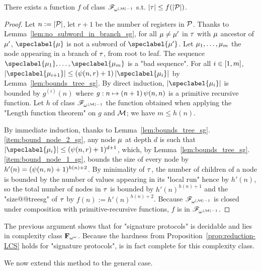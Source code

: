 \begin{proposition}
\label{prop:bounded_witness_sg}
There exists a function $f$ of class $\mathscr{F}_{\omega^{|\mathcal{M}|-1}}$ s.t. $|\tau| \leq f(|\mathcal{P}|)$. 
\end{proposition}
\begin{proof}
Let $n := |\mathcal{P}|$, let $r+1$ be the number of registers in $\mathcal{P}$. Thanks to Lemma~\ref{lem:no_subword_in_branch_sg}, for all $\mu \ne \mu'$ in 
$\tau$ with $\mu$ ancestor of $\mu'$, $\speclabel{\node}$ is not a subword of $\speclabel{\node'}$.  Let $\mu_1, \dots, \mu_m$ the node appearing in a branch of $\tau$, from root to leaf. The sequence $\speclabel{\node_1}, \dots, \speclabel{\node_m}$ is a "bad sequence".
For all $i \in [1,m]$, $\size{\speclabel{\node_{i+1}}}  \leq (\towerfun(n,r)+1) \, \size{\speclabel{\node_i}}$ by Lemma~\ref{lem:bounds_tree_sg}. By direct induction, $\size{\speclabel{\node_i}}$ is bounded by $g^{(i)}(n)$ where $g: n \mapsto (n+1)  \, \psi(n,n)$ is a primitive recursive function. Let $h$ of class $\mathscr{F}_{\omega^{|\mathcal{M}|-1}}$ the function obtained when applying the "Length function theorem" on $g$ and $\mathcal{M}$; we have $m \leq h(n)$. 

By immediate induction, thanks to Lemma~\ref{lem:bounds_tree_sg}.\ref{item:bound_node_2_sg}, any node $\mu$ at depth $d$ is such that $\size{\speclabel{\node_i}} \leq (\towerfun(n,r)+1)^{d+1}$, which, by Lemma~\ref{lem:bounds_tree_sg}.\ref{item:bound_node_1_sg}, bounds the size of every node by $h'(n) = (\psi(n,n)+1)^{h(n) + 2}$. 
By minimality of $\tau$, the number of children of a node is bounded by the number of values appearing in its "local run" hence by $h'(n)$, so the total number of nodes in $\tau$ is bounded by $h'(n)^{h(n)+1}$ and the "size@@treesg" of $\tau$ by $f(n) := h'(n)^{h(n)+2}$. Because $\mathscr{F}_{\omega^{|\mathcal{M}|-1}}$ is closed under composition with primitive-recursive functions, $f$ is in $\mathscr{F}_{\omega^{|\mathcal{M}|-1}}$.
\end{proof}

The previous argument shows that \COVER for "signature protocols" is decidable and lies in complexity class $\mathbf{F}_{\omega^\omega}$. Because the hardness from Proposition~\ref{prop:reduction-LCS} holds for "signature protocols", \COVER is in fact complete for this complexity class.

We now extend this method to the general case. 


